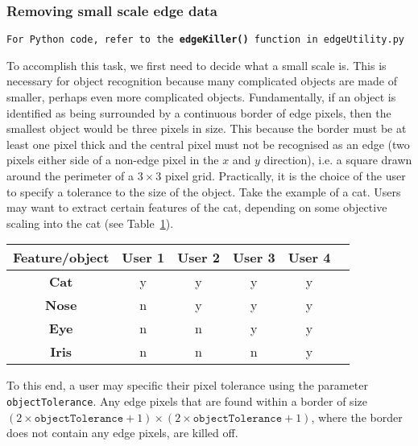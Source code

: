 \documentclass[11pt]{article}
\begin{document}
\subsubsection{Removing small scale edge data}
\begin{center}
\texttt{For Python code, refer to the {\bf edgeKiller()} function in edgeUtility.py}
\end{center}
To accomplish this task, we first need to decide what a small scale is. This is necessary for object recognition because many complicated objects are made of smaller, perhaps even more complicated objects. Fundamentally, if an object is identified as being surrounded by a continuous border of edge pixels, then the smallest object would be three pixels in size. This because the border must be at least one pixel thick and the central pixel must not be recognised as an edge (two pixels either side of a non-edge pixel in the $x$ and $y$ direction), i.e. a square drawn around the perimeter of a $3 \times 3$ pixel grid. Practically, it is the choice of the user to specify a tolerance to the size of the object. Take the example of a cat. Users may want to extract certain features of the cat, depending on some objective scaling into the cat (see Table~\ref{cat_table}).

\begin{table}[h]
\begin{center}
\begin{tabular}{|c|c|c|c|c|c|}
\hline
{\bf Feature/object} & {\bf User 1} & {\bf User 2} & {\bf User 3} & {\bf User 4}\\
\hline
{\bf Cat} & y & y & y & y\\
\hline
{\bf Nose} & n & y & y & y\\
\hline
{\bf Eye} & n & n & y & y\\
\hline
{\bf Iris} & n & n & n & y\\
\hline
\end{tabular}
\end{center}
\label{cat_table}
\end{table}

To this end, a user may specific their pixel tolerance using the parameter \texttt{objectTolerance}. Any edge pixels that are found within a border of size $(2\times \texttt{objectTolerance}+1) \times (2\times \texttt{objectTolerance}+1)$, where the border does not contain any edge pixels, are killed off.

\end{document}
